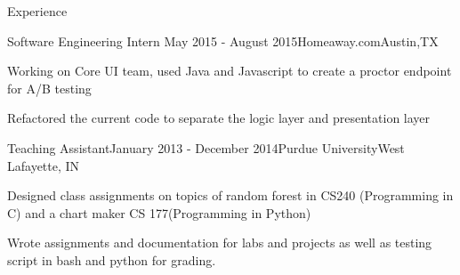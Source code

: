 \documentclass{resume} %
\begin{document}
\begin{rSection}{Experience}

\begin{rSubsection}{Software Engineering Intern }{May 2015 - August 2015}{Homeaway.com}{Austin,TX}
\item Working on Core UI team, used Java and Javascript to create a proctor endpoint for A/B testing 
\item Refactored the current code to separate the logic layer and presentation layer

\end{rSubsection}

\begin{rSubsection}{Teaching Assistant}{January 2013 - December 2014}{Purdue University}{West Lafayette, IN}
\item Designed class assignments on topics of random forest in CS240 (Programming in C) and a chart maker CS 177(Programming in Python)
\item Wrote assignments and documentation for labs and projects as well as testing script in bash and python for grading.
\end{rSubsection}


\end{rSection}


\end{document}
